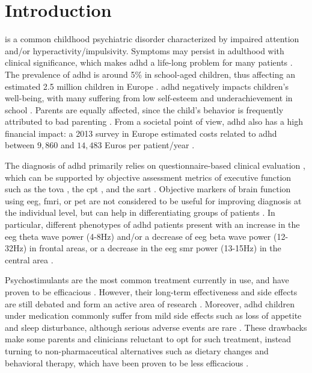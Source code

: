 

\section{Introduction} 

 is a common childhood psychiatric disorder characterized by impaired attention and/or hyperactivity/impulsivity.
Symptoms may persist in adulthood with clinical significance, which makes \gls{adhd} a life-long problem for many
patients \citep{Faraone2006}. The prevalence of \gls{adhd} is around 5\% in school-aged children, thus affecting an estimated
2.5 million children in Europe \citep{DSM-5}. \gls{adhd} negatively impacts children's well-being, with many suffering
from low self-esteem \citep{Shaw2005} and underachievement in school \citep{Barry2002}. Parents are equally affected, since 
the child's behavior is frequently attributed to bad parenting \citep{Harpin2005}. From a societal point
of view, \gls{adhd} also has a high financial impact: a 2013 survey in Europe estimated costs related to \gls{adhd} between $9,860$ and 
$14,483$ Euros per patient/year \citep{le2014}. 

The diagnosis of \gls{adhd} primarily relies on questionnaire-based clinical evaluation \citep{DSM-5}, which can be
supported by objective assessment metrics of executive function such as the \gls{tova} \citep{Forbes1998}, the
\gls{cpt} \citep{Barkley1991}, and the \gls{sart} \citep{Robertson1997}. Objective markers of brain function
using \gls{eeg}, \gls{fmri}, or \gls{pet} are not considered to be useful for improving diagnosis at the individual
level, but can help in differentiating groups of patients \citep{Johnstone2005}.  
In particular, different phenotypes of \gls{adhd} patients present with an increase in the \gls{eeg} theta wave 
power (4-8Hz) and/or a decrease of \gls{eeg} beta wave power (12-32Hz) in frontal areas, or a decrease in the \gls{eeg} 
\gls{smr} power (13-15Hz) in the central area \citep{Monastra2005, Matouvsek1984, Janzen1995, loo2017}.  

Psychostimulants are the most common treatment currently in use, and have proven to be efficacious
\citep{Taylor2014, Storebo2015}. However, their long-term effectiveness and side effects are still debated and form 
an active area of research \citep{DuPaul1998, Swanson2001, Jensen1999}. Moreover, \gls{adhd} children under medication 
commonly suffer from mild side effects such as loss of appetite and sleep disturbance, although serious adverse events
are rare \citep{Storebo2015, Cooper2011}. These drawbacks make some parents and clinicians reluctant to 
opt for such treatment, instead turning to non-pharmaceutical alternatives such as dietary changes \citep{Belanger2009} and behavioral 
therapy, which have been proven to be less efficacious \citep{Sonuga-Barke2013}.

